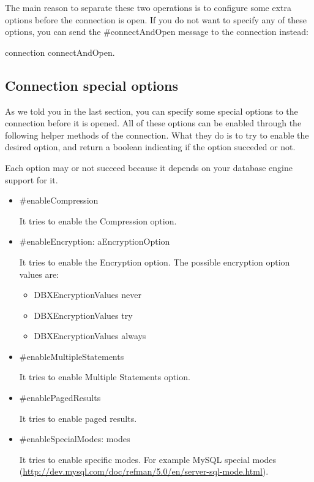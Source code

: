 \documentclass[a4paper,10pt,twoside]{book}
\begin{document}
The main reason to separate these two operations is to configure some extra options before the connection is open.  If you do not want to specify any of these options, you can send the \#connectAndOpen message to the connection instead:

\begin{code}{}
connection connectAndOpen.
\end{code}

\subsection{Connection special options}

As we told you in the last section, you can specify some special options to the connection before it is opened.  All of these options can be enabled through the following helper methods of the connection.  What they do is to try to enable the desired option, and return a boolean indicating if the option succeded or not.

Each option may or not succeed because it depends on your database engine support for it.

\begin{itemize}
\item \#enableCompression

It tries to enable the Compression option.

\item \#enableEncryption: aEncryptionOption

It tries to enable the Encryption option.  The possible encryption option values are:
\begin{itemize}
    \item DBXEncryptionValues never
    \item DBXEncryptionValues try
    \item DBXEncryptionValues always
\end{itemize}

\item \#enableMultipleStatements

It tries to enable Multiple Statements option.

\item \#enablePagedResults

It tries to enable paged results.

\item \#enableSpecialModes: modes 

	It tries to enable specific modes. For example MySQL special modes (\url{http://dev.mysql.com/doc/refman/5.0/en/server-sql-mode.html}).

\end{itemize}

\ifx\wholebook\relax\else
   
   
\end{document}
